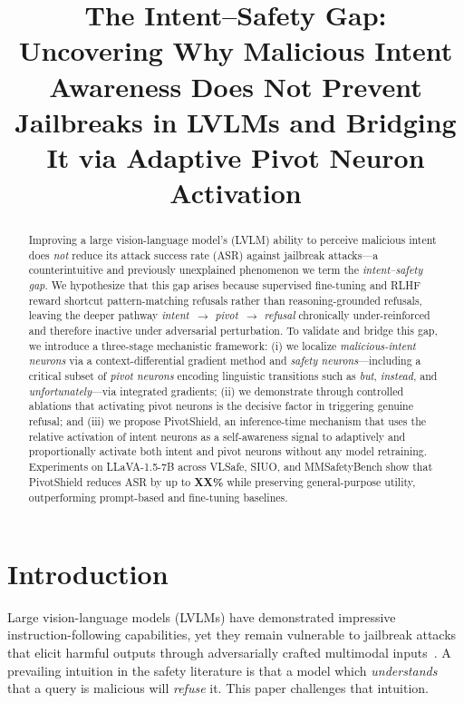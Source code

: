 \documentclass{article}
\title{The Intent--Safety Gap:\\
Uncovering Why Malicious Intent Awareness Does Not Prevent\\
Jailbreaks in LVLMs and Bridging It via Adaptive Pivot Neuron Activation}
\newcommand{\method}{PivotShield\xspace}
\begin{document}
\maketitle

\begin{abstract}
Improving a large vision-language model's (LVLM) ability to perceive
malicious intent does \emph{not} reduce its attack success rate (ASR)
against jailbreak attacks---a counterintuitive and previously
unexplained phenomenon we term the \emph{intent--safety gap}.
We hypothesize that this gap arises because supervised fine-tuning
and RLHF reward shortcut pattern-matching refusals rather than
reasoning-grounded refusals, leaving the deeper pathway
\emph{intent~$\!\to\!$ pivot~$\!\to\!$ refusal}
chronically under-reinforced and therefore inactive under adversarial
perturbation.
To validate and bridge this gap, we introduce a three-stage
mechanistic framework: (i) we localize \emph{malicious-intent
neurons} via a context-differential gradient method and
\emph{safety neurons}---including a critical subset of
\emph{pivot neurons} encoding linguistic transitions such as
\emph{but}, \emph{instead}, and \emph{unfortunately}---via
integrated gradients; (ii) we demonstrate through controlled
ablations that activating pivot neurons is the decisive factor
in triggering genuine refusal; and (iii) we propose \method, an
inference-time mechanism that uses the relative activation of
intent neurons as a self-awareness signal to adaptively and
proportionally activate both intent and pivot neurons without
any model retraining.
Experiments on LLaVA-1.5-7B across VLSafe, SIUO, and
MMSafetyBench show that \method reduces ASR by up to
\textbf{XX\%} while preserving general-purpose utility,
outperforming prompt-based and fine-tuning baselines.
\end{abstract}

\section{Introduction}
\label{sec:intro}

Large vision-language models (LVLMs) have demonstrated impressive
instruction-following capabilities, yet they remain vulnerable to
jailbreak attacks that elicit harmful outputs through adversarially
crafted multimodal inputs~\citep{PLACEHOLDER_jailbreak_survey_verify}.
A prevailing intuition in the safety literature is that a model
which \emph{understands} that a query is malicious will
\emph{refuse} it.
This paper challenges that intuition.
\end{document}
